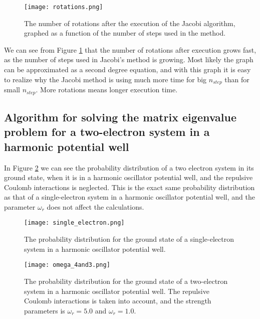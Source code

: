 \documentclass[12pt]{article}
\begin{document}
\begin{flushleft}
\begin{figure}[h!]
\begin{center}
\texttt{[image: rotations.png]}
\caption{\label{fig:rotations}The number of rotations after the execution of the Jacobi algorithm, graphed as a function of the number of steps used in the method. }
\end{center}
\end{figure}
\newpage
We can see from Figure \ref{fig:rotations} that the number of rotations after execution grows fast, as the number of steps used in Jacobi's method is growing. Most likely the graph can be approximated as a second degree equation, and with this graph it is easy to realize why the Jacobi method is using much more time for big $n_{step}$ than for small $n_{step}$. More rotations means longer execution time.

\subsection{Algorithm for solving the matrix eigenvalue problem for a two-electron system in a harmonic potential well}
In Figure \ref{fig:single_electron} we can see the probability distribution of a two electron system in its ground state, when it is in a harmonic oscillator potential well, and the repulsive Coulomb interactions is neglected. This is the exact same probability distribution as that of a single-electron system in a harmonic oscillator potential well, and the parameter $\omega_r$ does not affect the calculations.
\begin{figure}[h!]
\begin{center}
\texttt{[image: single\_electron.png]}
\caption{\label{fig:single_electron}The probability distribution for the ground state of a single-electron system in a harmonic oscillator potential well.}
\end{center}
\end{figure}
\newpage

\begin{figure}[h!]
\begin{center}
\texttt{[image: omega\_4and3.png]}
\caption{\label{fig:omega_4_3}The probability distribution for the ground state of a two-electron system in a harmonic oscillator potential well. The repulsive Coulomb interactions is taken into account, and the strength parameters is $\omega_r = 5.0$ and $\omega_r = 1.0$.}
\end{center}
\end{figure}


\end{flushleft}
\end{document}
